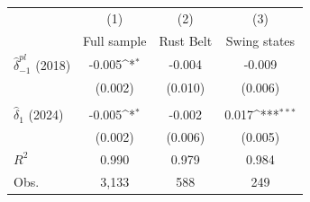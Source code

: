 {
\def\sym#1{\ifmmode^{#1}\else\(^{#1}\)\fi}
\begin{tabular}{l*{3}{c}}
\toprule
                         &\multicolumn{1}{c}{(1)}         &\multicolumn{1}{c}{(2)}         &\multicolumn{1}{c}{(3)}         \\
                         & Full sample         &   Rust Belt         &Swing states         \\
\midrule
$\hat{\delta}_{-1}^{pl}$ (2018)&      -0.005\sym{*}  &      -0.004         &      -0.009         \\
                         &     (0.002)         &     (0.010)         &     (0.006)         \\
\addlinespace
\addlinespace            &                     &                     &                     \\
\addlinespace
$\hat{\delta}_{1}$ (2024)&      -0.005\sym{*}  &      -0.002         &       0.017\sym{***}\\
                         &     (0.002)         &     (0.006)         &     (0.005)         \\
\midrule
\(R^{2}\)                &       0.990         &       0.979         &       0.984         \\
Obs.                     &       3,133         &         588         &         249         \\
\bottomrule
\end{tabular}
}
